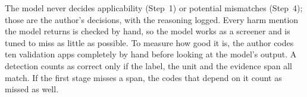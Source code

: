 The model never decides applicability (Step~1) or potential mismatches
(Step~4); those are the author's decisions, with the reasoning logged. Every
harm mention the model returns is checked by hand, so the model works as a
screener and is tuned to miss as little as possible. To measure how good it
is, the author codes ten validation apps completely by hand before looking at
the model's output. A detection counts as correct only if the label, the unit
and the evidence span all match. If the first stage misses a span, the codes
that depend on it count as missed as well.
